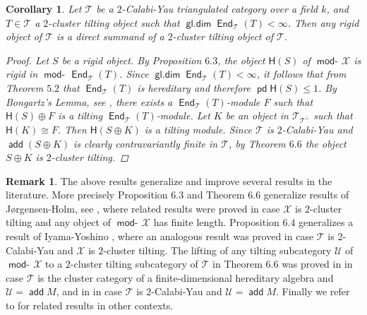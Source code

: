 \documentclass[oneside, a4paper,reqno]{amsart}
\numberwithin{equation}{section}
\newtheorem{cor}[thm]{Corollary}
\theoremstyle{definition}
\newtheorem{rem}[thm]{Remark}
\begin{document}
\begin{cor} Let ${\mathcal T}$ be a $2$-Calabi-Yau triangulated category over a field $k$, and $T \in {\mathcal T}$ a $2$-cluster tilting object such that $\operatorname*{\mathsf{gl.dim}}\operatorname*{\mathsf{End}}_{\mathcal T}(T) < \infty$. Then any rigid object of ${\mathcal T}$ is a direct summand of a $2$-cluster tilting object of ${\mathcal T}$. 
\begin{proof} Let $S$ be a rigid object.  By Proposition $6.3$, the object $\mathsf{H}(S)$ of $\operatorname*{\mathsf{mod}-\!}{\mathcal X}$ is rigid in $\operatorname*{\mathsf{mod}-\!}\operatorname*{\mathsf{End}}_{\mathcal T}(T)$.  Since $\operatorname*{\mathsf{gl.dim}}\operatorname*{\mathsf{End}}_{\mathcal T}(T) < \infty$,  it follows that from Theorem $5.2$ that $\operatorname*{\mathsf{End}}_{\mathcal T}(T)$ is hereditary and therefore $\operatorname{\mathsf{pd}}\mathsf{H}(S) \leq 1$. By Bongartz's Lemma, see \cite{Bongartz}, there exists a $\operatorname*{\mathsf{End}}_{\mathcal T}(T)$-module $F$ such that $\mathsf{H}(S) \oplus F$ is a tilting $\operatorname*{\mathsf{End}}_{\mathcal T}(T)$-module.   Let $K$ be an object in ${\mathcal T}_{{\mathcal T}^{\bot}}$ such that $\mathsf{H}(K) \cong F$. Then $\mathsf{H}(S\oplus K)$ is a tilting module. Since ${\mathcal T}$ is $2$-Calabi-Yau and $\operatorname*{\mathsf{add}}(S\oplus K)$ is clearly contravariantly finite in ${\mathcal T}$, by Theorem $6.6$ the object $S \oplus K$ is $2$-cluster tilting. 
\end{proof}
\end{cor}

\begin{rem} The above results generalize and improve several results in the literature. More precisely  Proposition $6.3$ and Theorem $6.6$ generalize results of J{\o}rgensen-Holm, see \cite[Proposition $1.5$, Theorem $3.4$, Proposition $3.6$]{JH}, where related results were proved in case ${\mathcal X}$ is $2$-cluster tilting and any object of $\operatorname*{\mathsf{mod}-\!}{\mathcal X}$ has finite length. Proposition $6.4$ generalizes a result of Iyama-Yoshino \cite[Corollary $6.5$]{IY}, where an analogous result was proved in case ${\mathcal T}$ is $2$-Calabi-Yau and ${\mathcal X}$ is $2$-cluster tilting.  The lifting of any tilting subcategory ${\mathcal U}$ of $\operatorname*{\mathsf{mod}-\!}{\mathcal X}$ to a $2$-cluster tilting subcategory of ${\mathcal T}$ in Theorem $6.6$ was proved in \cite[Theorem $1$]{Smith} in case ${\mathcal T}$ is the cluster category of a finite-dimensional hereditary algebra and ${\mathcal U}  = \operatorname*{\mathsf{add}} M$,  and in \cite[Theorem $3.3$]{FuLiu} in case ${\mathcal T}$ is $2$-Calabi-Yau and ${\mathcal U} = \operatorname*{\mathsf{add}} M$. Finally we refer to \cite[Proposition $2.26$]{IT} for related results in other contexts. 
\end{rem} 
\end{document}

